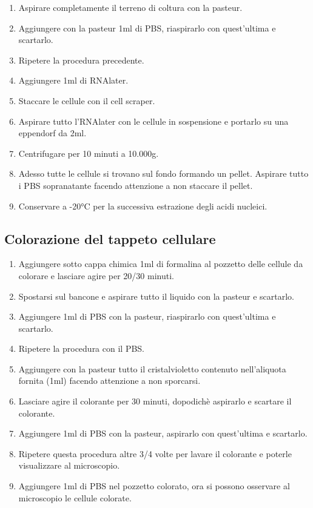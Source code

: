 \begin{enumerate}
    \item Aspirare completamente il terreno di coltura con la pasteur.
    \item Aggiungere con la pasteur 1ml di PBS, riaspirarlo con quest'ultima e scartarlo.
    \item Ripetere la procedura precedente.
    \item Aggiungere 1ml di RNAlater.
    \item Staccare le cellule con il cell scraper.
    \item Aspirare tutto l'RNAlater con le cellule in sospensione e portarlo su una
    eppendorf da 2ml.
    \item Centrifugare per 10 minuti a 10.000g.
    \item Adesso tutte le cellule si trovano sul fondo formando un pellet. Aspirare tutto
    i PBS sopranatante facendo attenzione a non staccare il pellet.
    \item Conservare a -20°C per la successiva estrazione degli acidi nucleici.
\end{enumerate}

\subsection{Colorazione del tappeto cellulare}

\begin{enumerate}
    \item Aggiungere sotto cappa chimica 1ml di formalina al pozzetto delle cellule da
    colorare e lasciare agire per 20/30 minuti.
    \item Spostarsi sul bancone e aspirare tutto il liquido con la pasteur e scartarlo.
    \item Aggiungere 1ml di PBS con la pasteur, riaspirarlo con quest'ultima e scartarlo.
    \item Ripetere la procedura con il PBS.
    \item Aggiungere con la pasteur tutto il cristalvioletto contenuto nell'aliquota fornita
    (1ml) facendo attenzione a non sporcarsi.
    \item Lasciare agire il colorante per 30 minuti, dopodich\`e aspirarlo e scartare il colorante.
    \item Aggiungere 1ml di PBS con la pasteur, aspirarlo con quest'ultima e scartarlo.
    \item Ripetere questa procedura altre 3/4 volte per lavare il colorante e poterle visualizzare
    al microscopio.
    \item Aggiungere 1ml di PBS nel pozzetto colorato, ora si possono osservare al
    microscopio le cellule colorate.
\end{enumerate}


